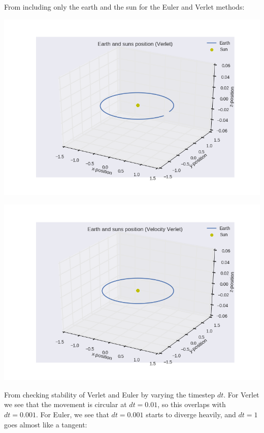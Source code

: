 \documentclass[11pt]{article}
\begin{document}
\begin{flushleft}
\begin{flushleft}
From including only the earth and the sun for the Euler and Verlet methods:
\begin{center}
\includegraphics[scale=0.6]{fig1_euler.png}
\end{center}

\begin{center}
\includegraphics[scale=0.6]{fig1_verlet.png}
\end{center}
\end{flushleft}

\begin{flushleft}
From checking stability of Verlet and Euler by varying the timestep $dt$. For Verlet we see that the movement is circular at $dt= 0.01$, so this overlaps with $dt=0.001$. For Euler, we see that $dt=0.001$ starts to diverge heavily, and $dt=1$ goes almost like a tangent:


\end{flushleft}
\end{flushleft}
\end{document}
